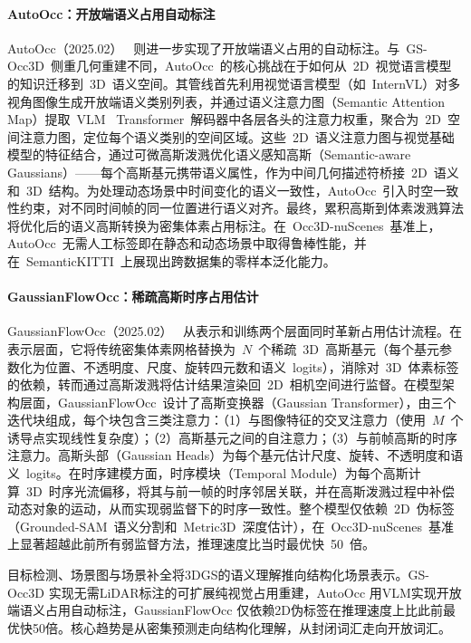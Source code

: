 \paragraph{AutoOcc：开放端语义占用自动标注} AutoOcc（2025.02）~\cite{2502_04981} 则进一步实现了开放端语义占用的自动标注。与~GS-Occ3D~侧重几何重建不同，AutoOcc~的核心挑战在于如何从~2D~视觉语言模型的知识迁移到~3D~语义空间。其管线首先利用视觉语言模型（如~InternVL）对多视角图像生成开放端语义类别列表，并通过语义注意力图（Semantic Attention Map）提取~VLM~ Transformer~解码器中各层各头的注意力权重，聚合为~2D~空间注意力图，定位每个语义类别的空间区域。这些~2D~语义注意力图与视觉基础模型的特征结合，通过可微高斯泼溅优化语义感知高斯（Semantic-aware Gaussians）——每个高斯基元携带语义属性，作为中间几何描述符桥接~2D~语义和~3D~结构。为处理动态场景中时间变化的语义一致性，AutoOcc~引入时空一致性约束，对不同时间帧的同一位置进行语义对齐。最终，累积高斯到体素泼溅算法将优化后的语义高斯转换为密集体素占用标注。在~Occ3D-nuScenes~基准上，AutoOcc~无需人工标签即在静态和动态场景中取得鲁棒性能，并在~SemanticKITTI~上展现出跨数据集的零样本泛化能力。

\paragraph{GaussianFlowOcc：稀疏高斯时序占用估计} GaussianFlowOcc（2025.02）~\cite{2502_17288} 从表示和训练两个层面同时革新占用估计流程。在表示层面，它将传统密集体素网格替换为~$N$~个稀疏~3D~高斯基元（每个基元参数化为位置、不透明度、尺度、旋转四元数和语义~logits），消除对~3D~体素标签的依赖，转而通过高斯泼溅将估计结果渲染回~2D~相机空间进行监督。在模型架构层面，GaussianFlowOcc~设计了高斯变换器（Gaussian Transformer），由三个迭代块组成，每个块包含三类注意力：（1）与图像特征的交叉注意力（使用~$M$~个诱导点实现线性复杂度）；（2）高斯基元之间的自注意力；（3）与前帧高斯的时序注意力。高斯头部（Gaussian Heads）为每个基元估计尺度、旋转、不透明度和语义~logits。在时序建模方面，时序模块（Temporal Module）为每个高斯计算~3D~时序光流偏移，将其与前一帧的时序邻居关联，并在高斯泼溅过程中补偿动态对象的运动，从而实现弱监督下的时序一致性。整个模型仅依赖~2D~伪标签（Grounded-SAM~语义分割和~Metric3D~深度估计），在~Occ3D-nuScenes~基准上显著超越此前所有弱监督方法，推理速度比当时最优快~50~倍。

\begin{takeaway}
目标检测、场景图与场景补全将3DGS的语义理解推向结构化场景表示。GS-Occ3D 实现无需LiDAR标注的可扩展纯视觉占用重建，AutoOcc 用VLM实现开放端语义占用自动标注，GaussianFlowOcc 仅依赖2D伪标签在推理速度上比此前最优快50倍。核心趋势是从密集预测走向结构化理解，从封闭词汇走向开放词汇。
\end{takeaway}

